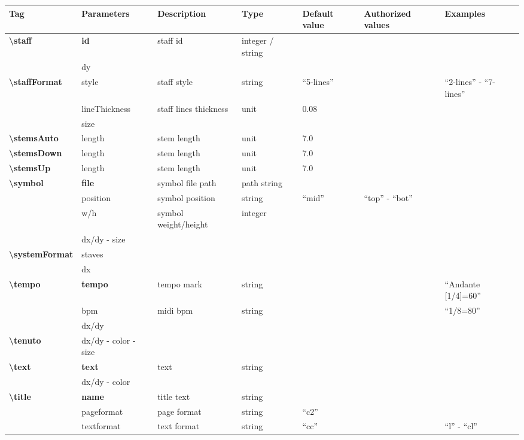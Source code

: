 \documentclass[a4paper, landscape, 10pt]{article}
\begin{document}
\begin{tabularx}{\linewidth}{p{3cm}p{3cm}p{5cm}p{3cm}p{2cm}p{3.5cm}p{4cm}}
    \hline
    \textbf{Tag}&\textbf{Parameters}&\textbf{Description}&\textbf{Type}&\textbf{Default value}&\textbf{Authorized values}&\textbf{Examples}\\
    \hline
    \textbf{\textbackslash{}staff}&\textbf{id}&staff id&integer / string&&&\\
    &dy&&&&&\\
    \hline
    \textbf{\textbackslash{}staffFormat}&style&staff style&string&``5-lines''&&``2-lines'' - ``7-lines''\\
    &lineThickness&staff lines thickness&unit&0.08&&\\
    &size&&&&&\\
    \hline
    \textbf{\textbackslash{}stemsAuto}&length&stem length&unit&7.0&&\\
    \hline
    \textbf{\textbackslash{}stemsDown}&length&stem length&unit&7.0&&\\
    \hline
    \textbf{\textbackslash{}stemsUp}&length&stem length&unit&7.0&&\\
    \hline
    \textbf{\textbackslash{}symbol}&\textbf{file}&symbol file path&path string&&&\\
    &position&symbol position&string&``mid''&``top'' - ``bot''&\\
    &w/h&symbol weight/height&integer&&&\\
    &dx/dy - size&&&&&\\
    \hline
    \textbf{\textbackslash{}systemFormat}&staves&&&&&\\ %
    &dx&&&&&\\
    \hline
    \textbf{\textbackslash{}tempo}&\textbf{tempo}&tempo mark&string&&&``Andante [1/4]=60''\\
    &bpm&midi bpm&string&&&``1/8=80''\\
    &dx/dy&&&&&\\
    \hline
    \textbf{\textbackslash{}tenuto}&dx/dy - color - size&&&&&\\
    \hline
    \textbf{\textbackslash{}text}&\textbf{text}&text&string&&&\\
    &dx/dy - color&&&&&\\
    \hline
    \textbf{\textbackslash{}title}&\textbf{name}&title text&string&&&\\
    &pageformat&page format&string&``c2''&&\\ %
    &textformat&text format&string&``cc''&&``l'' - ``cl''\\ %

\end{tabularx}
\end{document}
